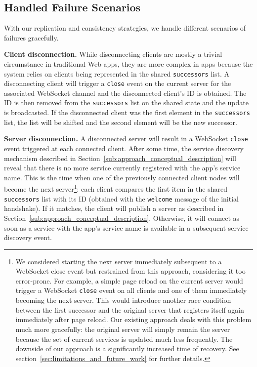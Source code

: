 \subsection{Handled Failure Scenarios}
\label{sub:approach_handled_failure_scenarios}

With our replication and consistency strategies, we handle different scenarios of failures gracefully.

\textbf{Client disconnection.} 
While disconnecting clients are mostly a trivial circumstance in traditional Web apps, they are more complex in \APIshort apps because the system relies on clients being represented in the shared \texttt{successors} list. 
A disconnecting client will trigger a \texttt{close} event on the current server for the associated WebSocket channel and the disconnected client's ID is obtained. 
The ID is then removed from the \texttt{successors} list on the shared state and the update is broadcasted. 
If the disconnected client was the first element in the \texttt{successors} list, the list will be shifted and the second element will be the new successor.

\textbf{Server disconnection.} 
A disconnected server will result in a WebSocket \texttt{close} event triggered at each connected client. 
After some time, the service discovery mechanism described in Section~\ref{sub:approach_conceptual_description} will reveal that there is no more service currently registered with the app's service name. 
This is the time when one of the previously connected client nodes will become the next server\footnote{We considered starting the next server immediately subsequent to a WebSocket close event but restrained from this approach, considering it too error-prone. For example, a simple page reload on the current server would trigger a WebSocket \texttt{close} event on all clients and one of them immediately becoming the next server. This would introduce another race condition between the first successor and the original server that registers itself again immediately after page reload. Our existing approach deals with this problem much more gracefully: the original server will simply remain the server because the set of current services is updated much less frequently. The downside of our approach is a significantly increased time of recovery. See section~\ref{sec:limitations_and_future_work} for further details.}: each client compares the first item in the shared \texttt{successors} list with its ID (obtained with the \texttt{welcome} message of the initial handshake). 
If it matches, the client will publish a server as described in Section~\ref{sub:approach_conceptual_description}. 
Otherwise, it will connect as soon as a service with the app's service name is available in a subsequent service discovery event.

